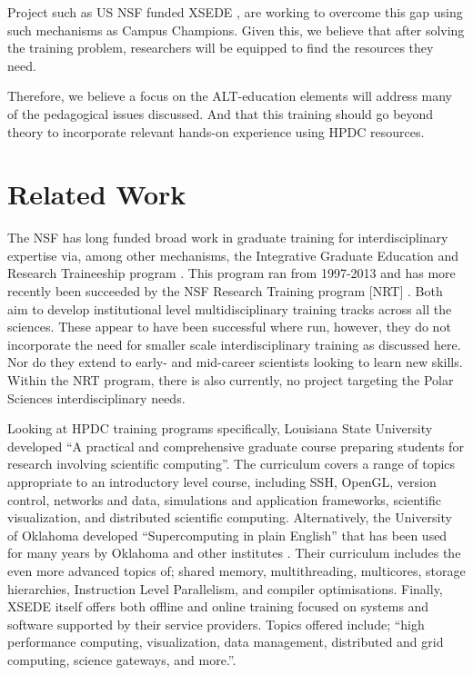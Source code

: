 \documentclass[conference]{IEEEtran}
\begin{document}
\begin{enumerate}
Project such as US NSF funded XSEDE \cite{noauthor_undated-lh}, are working to
overcome this gap using such mechanisms as Campus Champions.  Given this, we
believe that after solving the training problem, researchers will be equipped
to find the resources they need. \end{enumerate} Therefore, we believe a focus
on the ALT-education elements will address many of the pedagogical issues
discussed.  And that this training should go beyond theory to incorporate
relevant hands-on experience using HPDC resources.

\section{Related Work}
The NSF has long funded broad work in graduate training for interdisciplinary expertise via, among other mechanisms, the Integrative Graduate Education and Research Traineeship program \cite{noauthor_undated-bu}.  This program ran from 1997-2013 and has more recently been succeeded by the NSF Research Training program [NRT] \cite{NRT}.  Both aim to develop institutional level multidisciplinary training tracks across all the sciences. These appear to have been successful where run, however, they do not incorporate the need for smaller scale interdisciplinary training as discussed here.  Nor do they extend to early- and mid-career scientists looking to learn new skills. Within the NRT program, there is also currently, no project targeting the Polar Sciences interdisciplinary needs.

Looking at HPDC training programs specifically, Louisiana State University developed “A practical and comprehensive graduate course preparing students for research involving scientific computing”\cite{Allen2011-qx}. The curriculum covers a range of topics appropriate to an introductory level course, including SSH, OpenGL, version control, networks and data, simulations and application frameworks, scientific visualization, and distributed scientific computing. Alternatively, the University of Oklahoma  developed “Supercomputing in plain English” \cite{Neeman2002-dk} that has been used for many years by Oklahoma and other institutes \cite{Neeman2008-mj}.  Their curriculum includes the even more advanced topics of; shared memory, multithreading, multicores, storage hierarchies, Instruction Level Parallelism, and compiler optimisations.  Finally, XSEDE itself offers both offline and online training focused on systems and software supported by their service providers. Topics offered include; “high performance computing, visualization, data management, distributed and grid computing, science gateways, and more.”\cite{noauthor_undated-ht}.  
\end{document}
